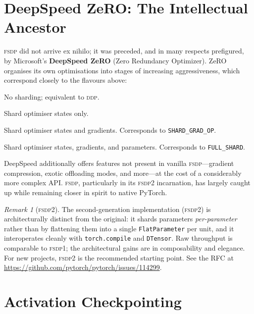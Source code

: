\documentclass[11pt,a4paper]{article}
\theoremstyle{definition}
\theoremstyle{remark}
\newtheorem*{remark}{Remark}
\newcommand{\FSDP}{\textsc{fsdp}}
\newcommand{\DDP}{\textsc{ddp}}
\newcommand{\code}[1]{\texttt{\small #1}}
\begin{document}
\section{DeepSpeed ZeRO: The Intellectual Ancestor}

\FSDP{} did not arrive ex nihilo; it was preceded, and in many respects prefigured, by Microsoft's \textbf{DeepSpeed ZeRO} (Zero Redundancy Optimizer). ZeRO organises its own optimisations into stages of increasing aggressiveness, which correspond closely to the flavours above:

\begin{description}[leftmargin=2.2em, style=nextline]
    \item[ZeRO-0] No sharding; equivalent to \DDP{}.
    \item[ZeRO-1] Shard optimiser states only.
    \item[ZeRO-2] Shard optimiser states and gradients. Corresponds to \texttt{SHARD\_GRAD\_OP}.
    \item[ZeRO-3] Shard optimiser states, gradients, and parameters. Corresponds to \texttt{FULL\_SHARD}.
\end{description}

DeepSpeed additionally offers features not present in vanilla \FSDP{}---gradient compression, exotic offloading modes, and more---at the cost of a considerably more complex API. \FSDP{}, particularly in its \FSDP{}2 incarnation, has largely caught up while remaining closer in spirit to native PyTorch.

\begin{remark}[\FSDP{}2]
The second-generation implementation (\FSDP{}2) is architecturally distinct from the original: it shards parameters \emph{per-parameter} rather than by flattening them into a single \texttt{FlatParameter} per unit, and it interoperates cleanly with \code{torch.compile} and \texttt{DTensor}. Raw throughput is comparable to \FSDP{}1; the architectural gains are in composability and elegance. For new projects, \FSDP{}2 is the recommended starting point. See the RFC at \url{https://github.com/pytorch/pytorch/issues/114299}.
\end{remark}

\section{Activation Checkpointing}
\end{document}
